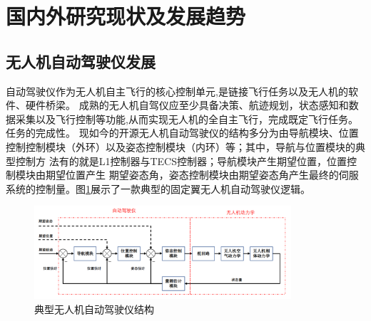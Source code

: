 \section{国内外研究现状及发展趋势}
\subsection{无人机自动驾驶仪发展}
自动驾驶仪作为无人机自主飞行的核心控制单元,是链接飞行任务以及无人机的软件、硬件桥梁。
成熟的无人机自驾仪应至少具备决策、航迹规划，状态感知和数据采集以及飞行控制等功能,从而实现无人机的全自主飞行，完成既定飞行任务。
任务的完成性。\cite{LiuLi2010}
现如今的开源无人机自动驾驶仪的结构多分为由导航模块、位置控制控制模块（外环）以及姿态控制模块（内环）等；其中，导航与位置模块的典型控制方
法有的就是L1控制器\cite{Park_2004}与TECS控制器\cite{Lambregts1983Vertical}；导航模块产生期望位置，位置控制模块由期望位置产生
期望姿态角，姿态控制模块由期望姿态角产生最终的伺服系统的控制量。图\ref{fig-c1-autopilot}展示了一款典型的固定翼无人机自动驾驶仪逻辑。
\begin{figure}[H]
    \centering
    \includegraphics[width=0.85\textwidth]{figures/c1/autopilot_struct}
    \caption{典型无人机自动驾驶仪结构}\label{fig-c1-autopilot}
\end{figure}
